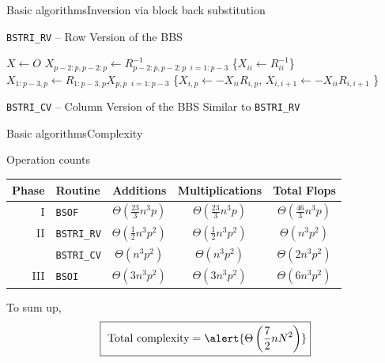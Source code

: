 \documentclass[xcolor=table,final]{beamer} %
\begin{document}
\begin{frame}{Basic algorithms}{Inversion via block back substitution}
  \begin{block}{{\tt BSTRI\_RV} -- Row Version of the BBS}
    \begin{algorithm}[H]

      \BlankLine

      $X \gets O$\; 
      $X_{p-2:p,p-2:p}\gets R_{p-2:p,p-2:p}^{-1}$\;
      \Batched$_{i = 1:p-3}$ \{$X_{ii}\gets R_{ii}^{-1}$\} \;
      $X_{1:p-3,p}\gets R_{1:p-3,p} X_{p,p} $ \;
      \Batched$_{i = 1:p-3}$ \{$X_{i,p}\gets -X_{ii}  R_{i,p}$, $X_{i,i+1}\gets -X_{ii}  R_{i,i+1}$ \} \;
    \end{algorithm}    
  \end{block}
  
  \begin{block}{{\tt BSTRI\_CV} -- Column Version of the BBS}
    Similar to {\tt BSTRI\_RV}
  \end{block}
\end{frame}

\begin{frame}{Basic algorithms}{Complexity}  
  \begin{block}{Operation counts}
    \begin{center}
      \begin{tabular}{r|l|c|c|c}
        \toprule
        Phase & Routine & Additions & Multiplications & Total Flops  \\
        \hline
        I&{\tt BSOF} & 
        $\displaystyle\Theta\left(\frac{23}{3} n^{3} p\right)$
        & $\displaystyle\Theta\left(\frac{23}{3} n^{3} p\right)$
        & $\displaystyle\Theta\left(\frac{46}{3} n^{3} p\right)$\\
        II&{\tt BSTRI\_RV} & 
        $\displaystyle\Theta\left(\frac{1}{2} n^3 p^{2}\right)$
        & $\displaystyle\Theta\left(\frac{1}{2} n^3 p^{2}\right)$
        & $\displaystyle\Theta\left(n^3 p^{2}\right)$\\
        \cline{2-5}
        &{\tt BSTRI\_CV} & 
        $\displaystyle\Theta\left(n^3 p^{2}\right)$
        & $\displaystyle\Theta \left(n^3 p^{2}\right)$
        & $\displaystyle\Theta \left(2 n^3 p^{2}\right)$\\
        III&{\tt BSOI} & 
        $\displaystyle\Theta \left(3 n^3 p^2\right)$
        & $\displaystyle\Theta \left(3 n^3 p^2\right)$
        & $\displaystyle\Theta \left(6 n^3 p^2\right)$\\
        \bottomrule  
      \end{tabular}
    \end{center}
    \pause
    To sum up, 
    \[
    \fbox{
      $\text{Total complexity} = \alert{\displaystyle\Theta\left(\frac{7}{2} n  N^2\right)}$}
    \]
  \end{block}
\end{frame}
\end{document}

